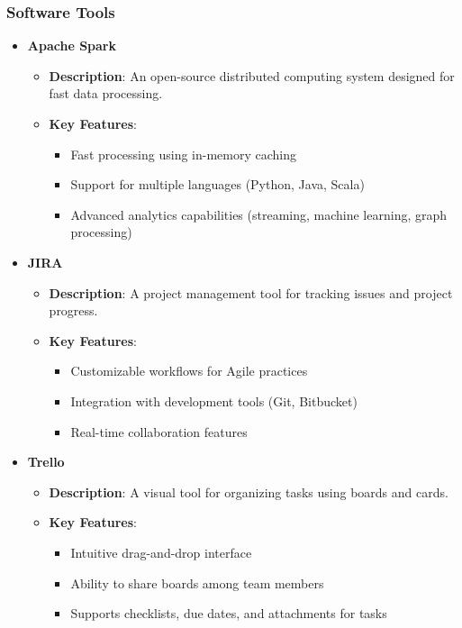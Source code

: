 \documentclass[aspectratio=169]{beamer}
\begin{document}
\begin{frame}[fragile]
    \frametitle{Software Tools}
    \begin{itemize}
        \item \textbf{Apache Spark}
        \begin{itemize}
            \item \textbf{Description}: An open-source distributed computing system designed for fast data processing.
            \item \textbf{Key Features}:
            \begin{itemize}
                \item Fast processing using in-memory caching
                \item Support for multiple languages (Python, Java, Scala)
                \item Advanced analytics capabilities (streaming, machine learning, graph processing)
            \end{itemize}
        \end{itemize}
        
        \item \textbf{JIRA}
        \begin{itemize}
            \item \textbf{Description}: A project management tool for tracking issues and project progress.
            \item \textbf{Key Features}:
            \begin{itemize}
                \item Customizable workflows for Agile practices
                \item Integration with development tools (Git, Bitbucket)
                \item Real-time collaboration features
            \end{itemize}
        \end{itemize}
        
        \item \textbf{Trello}
        \begin{itemize}
            \item \textbf{Description}: A visual tool for organizing tasks using boards and cards.
            \item \textbf{Key Features}:
            \begin{itemize}
                \item Intuitive drag-and-drop interface
                \item Ability to share boards among team members
                \item Supports checklists, due dates, and attachments for tasks
            \end{itemize}
        \end{itemize}
    \end{itemize}
\end{frame}
\end{document}
